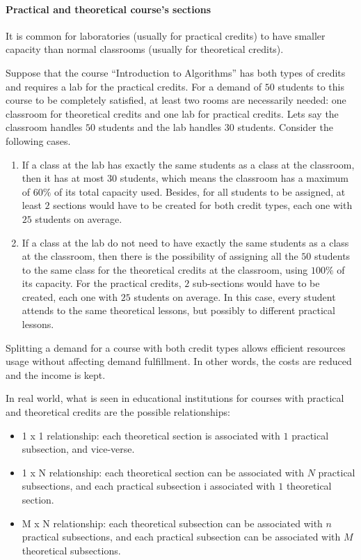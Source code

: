 \paragraph{Practical and theoretical course's sections}
\label{constrptrelation}

It is common for laboratories (usually for practical credits) to have smaller capacity than normal classrooms (usually for theoretical credits).

Suppose that the course ``Introduction to Algorithms'' has both types of credits and requires a lab for the practical credits.  For a demand of $50$ students to this course to be completely satisfied, at least two rooms are necessarily needed: one classroom for theoretical credits and one lab for practical credits. Lets say the classroom handles $50$ students and the lab handles $30$ students. Consider the following cases.
\begin{enumerate}
\item If a class at the lab has exactly the same students as a class at the classroom, then it has at most $30$ students, which means the classroom has a maximum of $60\%$ of its total capacity used. Besides, for all students to be assigned, at least $2$ sections would have to be created for both credit types, each one with $25$ students on average.
\item If a class at the lab do not need to have exactly the same students as a class at the classroom, then there is the possibility of assigning all the $50$ students to the same class for the theoretical credits at the classroom, using $100\%$ of its capacity. For the practical credits, $2$ sub-sections would have to be created, each one with $25$ students on average. In this case, every student attends to the same theoretical lessons, but possibly to different practical lessons.
\end{enumerate}

Splitting a demand for a course with both credit types allows efficient resources usage without affecting demand fulfillment. In other words, the costs are reduced and the income is kept.

In real world, what is seen in educational institutions for courses with practical and theoretical credits are the possible relationships:
\begin{itemize}
\item 1 x 1 relationship: each theoretical section is associated with $1$ practical subsection, and vice-verse.
\item 1 x N relationship: each theoretical section can be associated with $N$ practical subsections, and each practical subsection i associated with $1$ theoretical section.
\item M x N relationship: each theoretical subsection can be associated with $n$ practical subsections, and each practical subsection can be associated with $M$ theoretical subsections.
\end{itemize}

